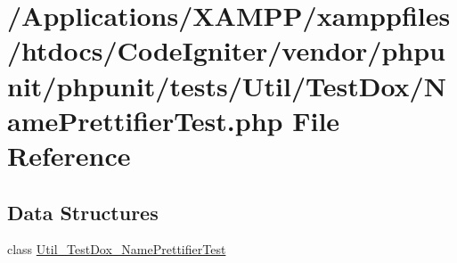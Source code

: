 \hypertarget{_name_prettifier_test_8php}{}\section{/\+Applications/\+X\+A\+M\+P\+P/xamppfiles/htdocs/\+Code\+Igniter/vendor/phpunit/phpunit/tests/\+Util/\+Test\+Dox/\+Name\+Prettifier\+Test.php File Reference}
\label{_name_prettifier_test_8php}
\subsection*{Data Structures}
\begin{DoxyCompactItemize}
\item 
class \mbox{\hyperlink{class_util___test_dox___name_prettifier_test}{Util\+\_\+\+Test\+Dox\+\_\+\+Name\+Prettifier\+Test}}
\end{DoxyCompactItemize}
